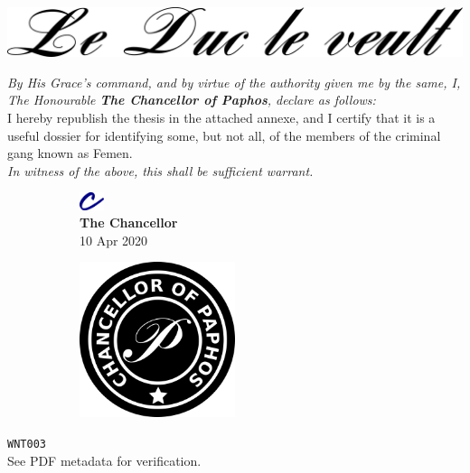 \documentclass[varwidth=true,border=50pt]{standalone}
\begin{document}
\noindent \includegraphics[width=\textwidth]{le_duc_le_veult}

\vspace{20pt}

\textit{By His Grace's command, and by virtue of the authority given me by the same, I, The Honourable \textbf{The Chancellor of Paphos}, declare as follows:}\\

I hereby republish the thesis in the attached annexe, and I certify that it is a useful dossier for identifying some, but not all, of the members of the criminal gang known as Femen.\\

\textit{In witness of the above, this shall be sufficient warrant.}

\vspace{20pt}

\begin{figure}
\centering
\begin{subfigure}{.5\textwidth}
    \centering
    \includegraphics[width=20pt]{c}\\
    \vspace{5pt}
    \textbf{The Chancellor}\\
    10 Apr 2020
\end{subfigure}%
\begin{subfigure}{.5\textwidth}
    \centering
    \includegraphics[width=0.5\textwidth]{stamp}
\end{subfigure}%
\end{figure}

\vspace{30pt}

\hfill {\footnotesize \texttt{WNT003}}\\

{\tiny See PDF metadata for verification.}
\end{document}
